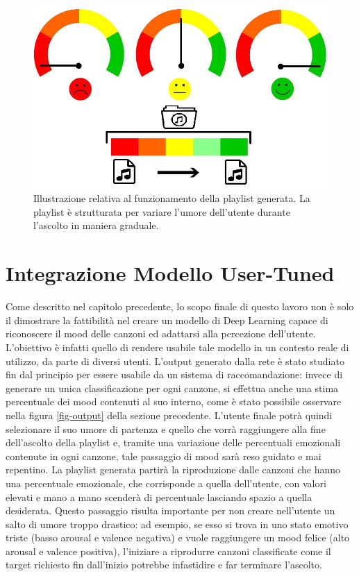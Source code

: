 \documentclass[11pt]{report}
\begin{document}
\begin{figure}[h]
\centering
\includegraphics[scale = 1.5]{img/playlist-emotion.jpg}
\caption{Illustrazione relativa al funzionamento della playlist generata. La playlist è strutturata per variare l'umore dell'utente durante l'ascolto in maniera graduale.}
\label{fig:playlist-emozioni}
\end{figure}


\section{Integrazione Modello User-Tuned}

Come descritto nel capitolo precedente, lo scopo finale di questo lavoro non è solo il dimostrare la fattibilità nel creare un modello di Deep Learning capace di riconoscere il mood delle canzoni ed adattarsi alla percezione dell'utente. L'obiettivo è infatti quello di rendere usabile tale modello in un contesto reale di utilizzo, da parte di diversi utenti. L'output generato dalla rete è stato studiato fin dal principio per essere usabile da un sistema di raccomandazione: invece di generare un unica classificazione per ogni canzone, si effettua anche una stima percentuale dei mood contenuti al suo interno, come è stato possibile osservare nella figura \ref{fig-output} della sezione precedente. L'utente finale potrà quindi selezionare il suo umore di partenza e quello che vorrà raggiungere alla fine dell'ascolto della playlist e, tramite una variazione delle percentuali emozionali contenute in ogni canzone, tale passaggio di mood sarà reso guidato e mai repentino. La playlist generata partirà la riproduzione dalle canzoni che hanno una percentuale emozionale, che corrisponde a quella dell'utente, con valori elevati e mano a mano scenderà di percentuale lasciando spazio a quella desiderata. Questo passaggio risulta importante per non creare nell'utente un salto di umore troppo drastico: ad esempio, se esso si trova in uno stato emotivo triste (basso arousal e valence negativa) e vuole raggiungere un mood felice (alto arousal e valence positiva), l'iniziare a riprodurre canzoni classificate come il target richiesto fin dall'inizio potrebbe infastidire e far terminare l'ascolto.
\end{document}
